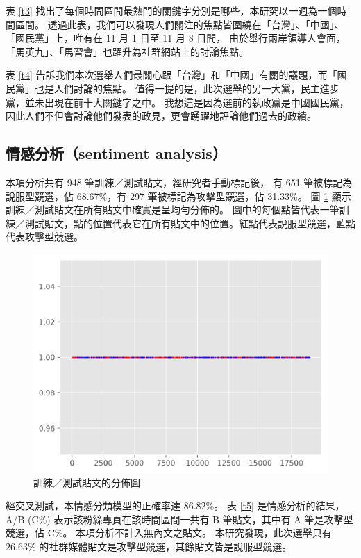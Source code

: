\documentclass[letterpaper, 10pt, conference]{ieeeconf}   %
\begin{document}
\begin{CJK}{UTF8}{bsmi}
表 \ref{t3} 找出了每個時間區間最熱門的關鍵字分別是哪些，本研究以一週為一個時間區間。%
透過此表，我們可以發現人們關注的焦點皆圍繞在「台灣」、「中國」、「國民黨」上，唯有在 11 月 1 日至 11 月 8 日間，%
由於舉行兩岸領導人會面，「馬英九」、「馬習會」也躍升為社群網站上的討論焦點。%

表 \ref{t4} 告訴我們本次選舉人們最關心跟「台灣」和「中國」有關的議題，而「國民黨」也是人們討論的焦點。%
值得一提的是，此次選舉的另一大黨，民主進步黨，並未出現在前十大關鍵字之中。%
我想這是因為選前的執政黨是中國國民黨，因此人們不但會討論他們發表的政見，更會踴躍地評論他們過去的政績。%

\subsection*{情感分析（sentiment analysis）}

本項分析共有 948 筆訓練／測試貼文，經研究者手動標記後，%
有 651 筆被標記為說服型競選，佔 68.67\%，有 297 筆被標記為攻擊型競選，佔 31.33\%。%
圖 \ref{f3} 顯示訓練／測試貼文在所有貼文中確實是呈均勻分佈的。%
圖中的每個點皆代表一筆訓練／測試貼文，點的位置代表它在所有貼文中的位置。紅點代表說服型競選，藍點代表攻擊型競選。%

\begin{figure}[!htbp]
\centering
\includegraphics[width=\columnwidth]{meta}
\caption{訓練／測試貼文的分佈圖}
\label{f3}
\end{figure}

經交叉測試，本情感分類模型的正確率達 86.82\%。%
表 \ref{t5} 是情感分析的結果，A/B (C\%) 表示該粉絲專頁在該時間區間一共有 B 筆貼文，其中有 A 筆是攻擊型競選，佔 C\%。%
本項分析不計入無內文之貼文。%
本研究發現，此次選舉只有 26.63\% 的社群媒體貼文是攻擊型競選，其餘貼文皆是說服型競選。%


\end{CJK}
\end{document}
